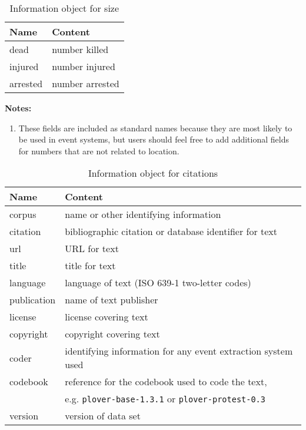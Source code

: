 \documentclass[11pt]{report}
\begin{document}
\begin{table}[htp]
\caption{Information object for size }
\begin{center}
\begin{tabular}{|l|l|}
\hline
Name & Content \\
\hline
dead & number killed \\
injured & number injured \\
arrested & number arrested \\
\hline
\end{tabular}
\end{center}
\label{tab:sizeinfo}
\noindent \textbf{Notes:}
\begin{enumerate}
\item These fields are included as standard names because they are most likely to be used in event systems, but users should feel free to add additional fields for numbers that are not related to location.
\end{enumerate}
\end{table}%

\begin{table}[htp]
\caption{Information object for citations }
\begin{center}
\begin{tabular}{|l|l|}
\hline
Name & Content \\
\hline
corpus & name or other identifying information\\
citation &  bibliographic citation or database identifier for text\\
url &  URL for text\\
title &  title for text\\
language & language of text (ISO 639-1 two-letter codes)\\
publication & name of text publisher\\
license & license covering text\\
copyright & copyright covering text\\
coder &  identifying information for any event extraction system used\\
codebook &  reference for the codebook used to code the text,\\
& e.g. \texttt{plover-base-1.3.1} or \texttt{plover-protest-0.3}\\
version &  version of data set\\
\hline
\end{tabular}
\end{center}
\label{tab:citeinfo}
\end{table}%
\end{document}
